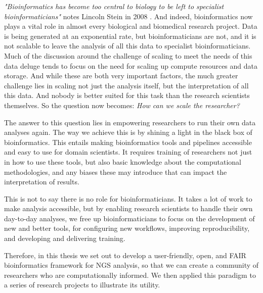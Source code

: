 \emph{"Bioinformatics has become too central to biology to be left to specialist bioinformaticians"} notes Lincoln Stein in 2008 \cite{stein2008bioinformatics}.
And indeed, bioinformatics now plays a vital role in almost every biological and biomedical research project.
Data is being generated at an exponential rate, but bioinformaticians are not,  and it is not scalable to leave the analysis of all this data to specialist bioinformaticians.
Much of the discussion around the challenge of scaling to meet the needs of this data deluge tends to focus on the need for scaling up compute resources and data storage.
And while these are both very important factors, the much greater challenge lies in scaling not just the analysis itself, but the interpretation of all this data.
And nobody is better suited for this task than the research scientists themselves. So the question now becomes: \emph{How can we scale the researcher?}

The answer to this question lies in empowering researchers to run their own data analyses again.
The way we achieve this is by shining a light in the black box of bioinformatics.
This entails making bioinformatics tools and pipelines accessible and easy to use for domain scientists.
It requires training of researchers not just in how to use these tools, but also basic knowledge about the computational methodologies, and any biases these may introduce that can impact the interpretation of results.

This is not to say there is no role for bioinformaticians.
It takes a lot of work to make analysis accessible, but by enabling research scientists to handle their own day-to-day analyses, we free up bioinformaticians to focus on the development of new and better tools, for configuring new workflows, improving reproducibility, and developing and delivering training.

Therefore, in this thesis we set out to develop a user-friendly, open, and FAIR bioinformatics framework for NGS analysis, so that we can create a community of researchers who are computationally informed.
We then applied this paradigm to a series of research projects to illustrate its utility.



